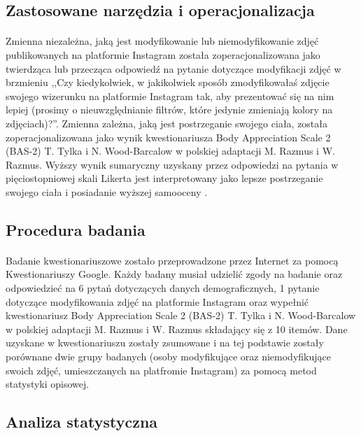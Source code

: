 \documentclass[12pt,a4paper,final,oneside,onecolumn,titlepage]{article}
\begin{document}
\subsection*{\normalsize{\textbf{Zastosowane narzędzia i operacjonalizacja}}}
\paragraph{}
Zmienna niezależna, jaką jest modyfikowanie lub niemodyfikowanie zdjęć publikowanych na platformie Instagram została zoperacjonalizowana jako twierdząca lub przecząca odpowiedź na pytanie dotyczące modyfikacji zdjęć w brzmieniu ,,Czy kiedykolwiek, w jakikolwiek sposób zmodyfikowałaś zdjęcie swojego wizerunku na platformie Instagram tak, aby prezentować się na nim lepiej (prosimy o nieuwzględnianie filtrów, które jedynie zmieniają kolory na zdjęciach)?''. Zmienna zależna, jaką jest postrzeganie swojego ciała, została zoperacjonalizowana jako wynik kwestionariusza Body Appreciation Scale 2 (BAS-2) T. Tylka i N. Wood-Barcalow w polskiej adaptacji M. Razmus i W. Razmus. Wyższy wynik sumaryczny uzyskany przez odpowiedzi na pytania w pięciostopniowej skali Likerta jest interpretowany jako lepsze postrzeganie swojego ciała i posiadanie wyższej samooceny \citep{razmus_evaluating_2017,tylka_body_2015}.
\subsection*{\normalsize{\textbf{Procedura badania}}}
\paragraph{}
Badanie kwestionariuszowe zostało przeprowadzone przez Internet za pomocą Kwestionariuszy Google. Każdy badany musiał udzielić zgody na badanie oraz odpowiedzieć na 6 pytań dotyczących danych demograficznych, 1 pytanie dotyczące modyfikowania zdjęć na platformie Instagram oraz wypełnić kwestionariusz Body Appreciation Scale 2 (BAS-2) T. Tylka i N. Wood-Barcalow w polskiej adaptacji M. Razmus i W. Razmus składający się z 10 itemów. Dane uzyskane w kwestionariuszu zostały zsumowane i na tej podstawie zostały porównane dwie grupy badanych (osoby modyfikujące oraz niemodyfikujące swoich zdjęć, umieszczanych na platfromie Instagram) za pomocą metod statystyki opisowej.
\subsection*{\normalsize{\textbf{Analiza statystyczna}}}
\paragraph{}
\newpage

\end{document}
